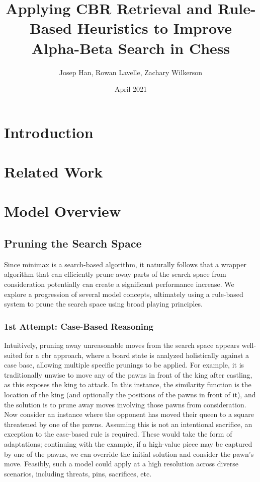 \documentclass[letterpaper]{article}
\title{Applying CBR Retrieval and Rule-Based Heuristics to Improve Alpha-Beta Search in Chess}
\author{Josep Han, Rowan Lavelle, Zachary Wilkerson}
\date{April 2021}
\begin{document}
\maketitle

\section{Introduction}
\section{Related Work}
\section{Model Overview}

\subsection{Pruning the Search Space}
Since minimax is a search-based algorithm, it naturally follows that a wrapper algorithm that can efficiently prune away parts of the search space from consideration potentially can create a significant performance increase.  We explore a progression of several model concepts, ultimately using a rule-based system to prune the search space using broad playing principles.

\subsubsection{1st Attempt: Case-Based Reasoning}
Intuitively, pruning away unreasonable moves from the search space appears well-suited for a \acrshort{cbr} approach, where a board state is analyzed holistically against a case base, allowing multiple specific prunings to be applied.  For example, it is traditionally unwise to move any of the pawns in front of the king after castling, as this exposes the king to attack.  In this instance, the similarity function is the location of the king (and optionally the positions of the pawns in front of it), and the solution is to prune away moves involving those pawns from consideration.  Now consider an instance where the opponent has moved their queen to a square threatened by one of the pawns.  Assuming this is not an intentional sacrifice, an exception to the case-based rule is required.  These would take the form of adaptations; continuing with the example, if a high-value piece may be captured by one of the pawns, we can override the initial solution and consider the pawn's move.  Feasibly, such a model could apply at a high resolution across diverse scenarios, including threats, pins, sacrifices, etc.
\end{document}
